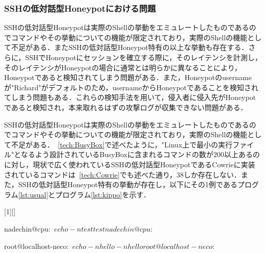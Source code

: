 \subsubsection{SSHの低対話型Honeypotにおける問題}
\label{appr:problemofSshLowHoneypot}
SSHの低対話型Honeypotは実際のShellの挙動をエミュレートしたものであるのでコマンドやその挙動についての機能が限定されており，実際のShellの機能として不足がある．またSSHの低対話型Honeypot特有の以上な挙動も存在する．さらに，SSHでHoneypotにセッションを確立する際に，そのレイテンシを計測し，そのレイテンシがHoneypotの場合に通常とは明らかに異なることにより，Honeypotであると検知されてしまう問題がある．また，Honeypotのusernameが"Richard"がデフォルトのため，usernameからHoneypotであることを検知されてしまう問題もある．これらの検知手法を用いて，侵入者に侵入先がHoneypotであると検知され，本来取れるはずの攻撃ログが収集できない問題がある．

\label{appr:LowHoneypotLatency}

\label{appr:LowHoneypotUsername}

\label{appr:LowHoneypotCommand}
SSHの低対話型Honeypotは実際のShellの挙動をエミュレートしたものであるのでコマンドやその挙動についての機能が限定されており，実際のShellの機能として不足がある．~\ref{tech:BusyBox}で述べたように，"Linux上で最小の実行ファイル"となるよう設計されているBusyBoxに含まれるコマンドの数が200以上あるのに対し，現状で広く使われているSSHの低対話型HoneypotであるCowrieに実装されているコマンドは~\ref{tech:Cowrie}でも述べた通り，38しか存在しない．また，SSHの低対話型Honeypot特有の挙動が存在し，以下にその1例であるプログラム\ref{lst:usual}とプログラム\ref{lst:kippo}を示す．

\vspace{5mm}
[1][]
    {\lstset{
        frame=single,
        basicstyle=\ttfamily,
        numbers=left,
        numbersep=10pt,
        tabsize=2,
        extendedchars=true,
        xleftmargin=17pt,
        framexleftmargin=17pt,
        #1
    }
}{}

\begin{mylisting}[label={lst:usual},language=sh,caption=正しいShellの挙動]
nadechin@cpu:~$ echo -n test
testnadechin@cpu:~$
\end{mylisting}

\begin{mylisting}[label={lst:kippo},language=sh,caption=Kippo特有の異常な挙動の例]
root@localhost-neco:~$ echo -n hello
-n hello
root@localhost-neco:~$
\end{mylisting}

